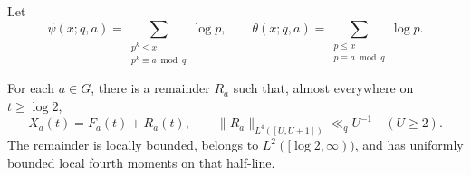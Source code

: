 Let
\[
 \psi(x;q,a)=\sum_{\substack{p^k\leq x\\p^k\equiv a\bmod q}}\log p,
 \qquad
 \theta(x;q,a)=\sum_{\substack{p\leq x\\p\equiv a\bmod q}}\log p.
\]

\begin{lemma}
\label{lem:pf-transfer}
For each $a\in G$, there is a remainder $R_a$ such that, almost everywhere
on $t\geq\log2$,
\begin{equation}
\label{eq:pf-XF}
 X_a(t)=F_a(t)+R_a(t),
 \qquad
 \|R_a\|_{L^4([U,U+1])}\ll_q U^{-1}\quad(U\geq2).
\end{equation}
The remainder is locally bounded, belongs to $L^2([\log2,\infty))$, and
has uniformly bounded local fourth moments on that half-line.
\end{lemma}

